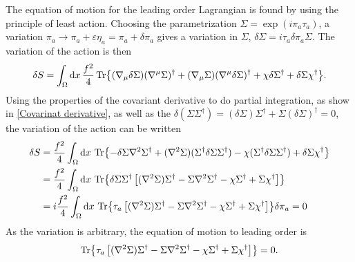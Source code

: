 \documentclass{article}
\begin{document}
The equation of motion for the leading order Lagrangian is found by using the principle of least action.
Choosing the parametrization $\Sigma = \exp(i \pi_a \tau_a)$, a variation $\pi_a \rightarrow \pi_a + \varepsilon \eta_a = \pi_a + \delta \pi_a$ gives a variation in $\Sigma$, $\delta \Sigma = i \tau_a \delta \pi_a \Sigma $. 
The variation of the action is then 
\begin{align*}
    \delta S = \int_\Omega \dd x \, \frac{f^2}{4}
    \Tr{
        (\nabla_\mu \delta \Sigma) (\nabla^\mu \Sigma)^\dagger
        + (\nabla_\mu \Sigma) (\nabla^\mu \delta \Sigma)^\dagger
        + \chi \delta \Sigma^\dagger + \delta \Sigma \chi^\dagger
    }.
\end{align*}
Using the properties of the covariant derivative to do partial integration, as show in \autoref{Covarinat derivative}, as well as the $\delta(\Sigma \Sigma^\dagger) = (\delta\Sigma)\Sigma^\dagger + \Sigma (\delta \Sigma)^\dagger = 0$, the variation of the action can be written
\begin{align*}
    \delta S 
    & = \frac{f^2}{4} \int_\Omega \dd x\, 
    \Tr{
        - \delta \Sigma \nabla^2 \Sigma^\dagger
        + (\nabla^2 \Sigma) (\Sigma^\dagger \delta \Sigma \Sigma^\dagger)
        - \chi (\Sigma^\dagger \delta \Sigma \Sigma^\dagger)
        + \delta \Sigma \chi^\dagger
    } \\
    & = 
    \frac{f^2}{4} \int_\Omega \dd x\, 
    \Tr{
        \delta \Sigma \Sigma^\dagger 
        \left[
            (\nabla^2 \Sigma)\Sigma^\dagger
            - \Sigma \nabla^2 \Sigma^\dagger
            - \chi \Sigma^\dagger
            + \Sigma \chi^\dagger
        \right]
        } \\
    & = 
    i \frac{f^2}{4} \int_\Omega \dd x\, 
    \Tr{\tau_a 
    \left[
         (\nabla^2 \Sigma)\Sigma^\dagger
        - \Sigma \nabla^2 \Sigma^\dagger
        - \chi \Sigma^\dagger
        + \Sigma \chi^\dagger
    \right]
    } 
    \delta \pi_a = 0
\end{align*}  
As the variation is arbitrary, the equation of motion to leading order is
\begin{equation}
    \Tr{
        \tau_a 
        \left[
            (\nabla^2 \Sigma)\Sigma^\dagger
            - \Sigma \nabla^2 \Sigma^\dagger
            - \chi \Sigma^\dagger
            + \Sigma \chi^\dagger
        \right]
    } = 0.
\end{equation}
\end{document}

